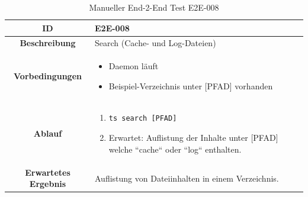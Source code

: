 \documentclass[a4paper,12pt]{report}
\begin{document}
    \begin{table}[h!]
        \centering
        \setlength{\leftmargini}{0.8cm}
        \begin{tabular}{|c|p{10cm}|}
            \hline
            \textbf{ID}                  & E2E-008                                            \\ \hline
            \textbf{Beschreibung}        & Search (Cache- und Log-Dateien)                    \\ \hline
            \textbf{Vorbedingungen} &
            \begin{itemize}
                \item Daemon läuft
                \item Beispiel-Verzeichnis unter [PFAD] vorhanden
            \end{itemize} \\ \hline
            \textbf{Ablauf} &
            \begin{enumerate}
                \item \begin{verbatim}ts search [PFAD]
                \end{verbatim}
                \item Erwartet: Auflistung der Inhalte unter [PFAD] welche ``cache`` oder ``log`` enthalten.
            \end{enumerate} \\ \hline
            \textbf{Erwartetes Ergebnis} & Auflistung von Dateiinhalten in einem Verzeichnis. \\ \hline
        \end{tabular}
        \caption{Manueller End-2-End Test E2E-008}\label{tab:e2e-8}
    \end{table}
\end{document}
